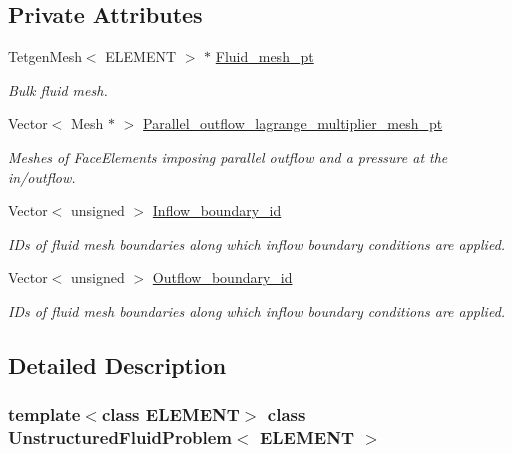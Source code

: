 \subsection*{Private Attributes}
\begin{DoxyCompactItemize}
\item 
Tetgen\+Mesh$<$ E\+L\+E\+M\+E\+NT $>$ $\ast$ \hyperlink{classUnstructuredFluidProblem_ade90cb92dd49b9d897ed538b1876b060}{Fluid\+\_\+mesh\+\_\+pt}
\begin{DoxyCompactList}\small\item\em Bulk fluid mesh. \end{DoxyCompactList}\item 
Vector$<$ Mesh $\ast$ $>$ \hyperlink{classUnstructuredFluidProblem_a537c5d8a474eccb58f4de75cbdab4e9d}{Parallel\+\_\+outflow\+\_\+lagrange\+\_\+multiplier\+\_\+mesh\+\_\+pt}
\begin{DoxyCompactList}\small\item\em Meshes of Face\+Elements imposing parallel outflow and a pressure at the in/outflow. \end{DoxyCompactList}\item 
Vector$<$ unsigned $>$ \hyperlink{classUnstructuredFluidProblem_a2923e009bcea7cdbdd7ea5788580a3f8}{Inflow\+\_\+boundary\+\_\+id}
\begin{DoxyCompactList}\small\item\em I\+Ds of fluid mesh boundaries along which inflow boundary conditions are applied. \end{DoxyCompactList}\item 
Vector$<$ unsigned $>$ \hyperlink{classUnstructuredFluidProblem_a9bace139103152045dfe88e3d0163811}{Outflow\+\_\+boundary\+\_\+id}
\begin{DoxyCompactList}\small\item\em I\+Ds of fluid mesh boundaries along which inflow boundary conditions are applied. \end{DoxyCompactList}\end{DoxyCompactItemize}


\subsection{Detailed Description}
\subsubsection*{template$<$class E\+L\+E\+M\+E\+NT$>$\newline
class Unstructured\+Fluid\+Problem$<$ E\+L\+E\+M\+E\+N\+T $>$}

